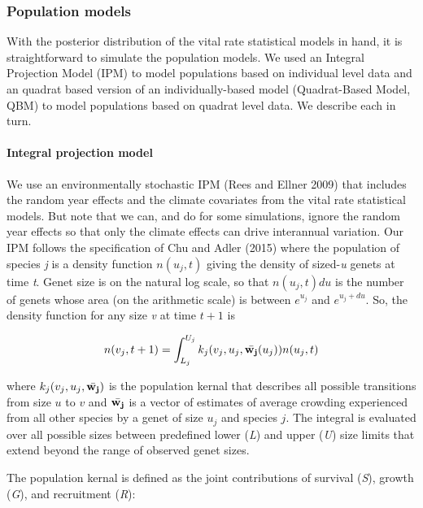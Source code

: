 \documentclass[12pt,]{article}
\begin{document}
\subsubsection{Population models}\label{population-models}

With the posterior distribution of the vital rate statistical models in
hand, it is straightforward to simulate the population models. We used
an Integral Projection Model (IPM) to model populations based on
individual level data and an quadrat based version of an
individually-based model (Quadrat-Based Model, QBM) to model populations
based on quadrat level data. We describe each in turn.

\paragraph{Integral projection model}\label{integral-projection-model}

We use an environmentally stochastic IPM (Rees and Ellner 2009) that
includes the random year effects and the climate covariates from the
vital rate statistical models. But note that we can, and do for some
simulations, ignore the random year effects so that only the climate
effects can drive interannual variation. Our IPM follows the
specification of Chu and Adler (2015) where the population of species
\emph{j} is a density function \(n(u_{j},t)\) giving the density of
sized-\emph{u} genets at time \emph{t}. Genet size is on the natural log
scale, so that \(n(u_{j},t)du\) is the number of genets whose area (on
the arithmetic scale) is between \(e^{u_{j}}\) and \(e^{u_{j}+du}\). So,
the density function for any size \emph{v} at time \(t+1\) is

\begin{equation}
n(v_{j},t+1) = \int_{L_{j}}^{U_{j}} k_{j}(v_{j},u_{j},\bar{\bold{w_{j}}}(u_{j}))n(u_{j},t)
\end{equation}

where \(k_{j}(v_{j},u_{j},\bar{\bold{w_{j}}})\) is the population kernal
that describes all possible transitions from size \(u\) to \(v\) and
\(\bar{\bold{w_{j}}}\) is a vector of estimates of average crowding
experienced from all other species by a genet of size \(u_j\) and
species \(j\). The integral is evaluated over all possible sizes between
predefined lower (\emph{L}) and upper (\emph{U}) size limits that extend
beyond the range of observed genet sizes.

The population kernal is defined as the joint contributions of survival
(\emph{S}), growth (\emph{G}), and recruitment (\emph{R}):
\end{document}
